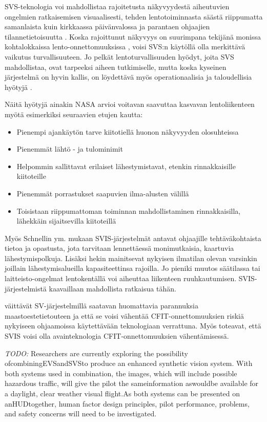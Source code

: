 \documentclass[utf8,bachelor,manualbib]{gradu3}
\begin{document}
SVS-teknologia voi mahdollistaa rajoitetusta näkyvyydestä aiheutuvien ongelmien ratkaisemisen visuaalisesti, tehden lentotoiminnasta säästä riippumatta samanlaista kuin kirkkaassa päivänvalossa ja parantaen ohjaajien tilannetietoisuutta \citep{prinzel2004}. Koska rajoittunut näkyvyys on suurimpana tekijänä monissa kohtalokkaissa lento-onnettomuuksissa \citep{boeing1996}, voisi SVS:n käytöllä olla merkittävä vaikutus turvallisuuteen. Jo pelkät lentoturvallisuuden hyödyt, joita SVS mahdollistaa, ovat tarpeeksi aiheen tutkimiselle, mutta koska kyseinen järjestelmä on hyvin kallis, on löydettävä myös operationaalisia ja taloudellisia hyötyjä \citep{prinzel2004}.

Näitä hyötyjä ainakin NASA \citeyearpar{williamsym2001} arvioi voitavan saavuttaa kasvavan lentoliikenteen myötä esimerkiksi seuraavien etujen kautta:

\begin{itemize}
\item Pienempi ajankäytön tarve kiitotiellä huonon näkyvyyden olosuhteissa
\item Pienemmät lähtö - ja tulominimit
\item Helpommin sallittavat erilaiset lähestymistavat, etenkin rinnakkaisille kiitoteille
\item Pienemmät porrastukset saapuvien ilma-alusten välillä
\item Toisistaan riippumattoman toiminnan mahdollistaminen rinnakkaisilla, lähekkäin sijaitsevilla kiitoteillä
\end{itemize} 

Myös Schnellin ym. \citeyearpar{schnellym2004} mukaan SVIS-järjestelmät antavat ohjaajille tehtäväkohtaista tietoa ja opastusta, jota tarvitaan lennettäessä monimutkaisia, kaartuvia lähestymispolkuja. Lisäksi hekin mainitsevat nykyisen ilmatilan olevan varsinkin joillain lähestymisalueilla kapasiteettinsa rajoilla. Jo pieniki muutos säätilassa tai laitteisto-ongelmat lentokentällä voi aiheuttaa liikenteen ruuhkautumisen. SVIS-järjestelmistä kaavaillaan mahdollista ratkaisua tähän. 

\cite{baileyym2007} väittävät SV-järjestelmillä saatavan huomattavia parannuksia maastoestetietouteen ja että se voisi vähentää CFIT-onnettomuuksien riskiä nykyiseen ohjaamoissa käytettävään teknologiaan verrattuna. Myös \cite{schnellym2004} toteavat, että SVIS voisi olla avainteknologia CFIT-onnettomuuksien vähentämisessä.



\emph{TODO:}
Researchers are currently exploring the possibility ofcombiningEVSandSVSto
produce an enhanced synthetic vision system. With both systems used in combination,
the images, which will include possible hazardous traffic, will give the pilot the
sameinformation aswouldbe available for a daylight, clear weather visual flight.As
both systems can be presented on anHUDtogether, human factor design principles,
pilot performance, problems, and safety concerns will need to be investigated. \citep{crawfordneal2006}
\end{document}
